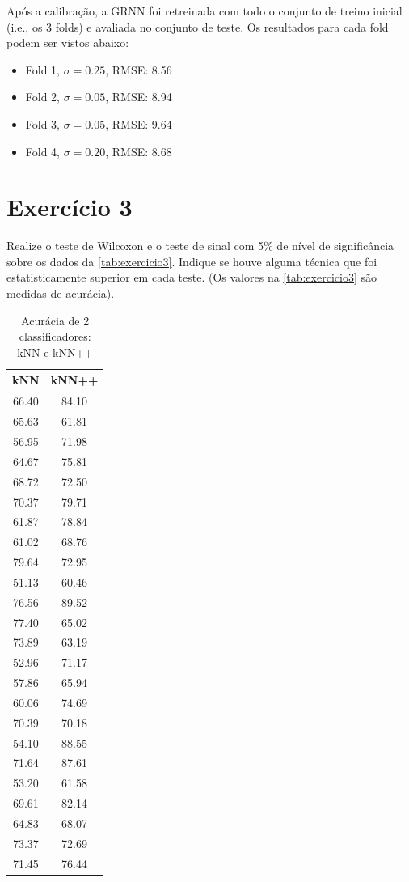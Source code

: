 \documentclass{article}
\begin{document}
Após a calibração, a GRNN foi retreinada com todo o conjunto de treino inicial (i.e., os 3 folds) e avaliada no conjunto de teste. Os resultados para cada fold podem ser vistos abaixo:

\begin{itemize}
	\item Fold 1, $\sigma=0.25$, RMSE: 8.56
	\item Fold 2, $\sigma=0.05$, RMSE: 8.94
	\item Fold 3, $\sigma=0.05$, RMSE: 9.64
	\item Fold 4, $\sigma=0.20$, RMSE: 8.68
\end{itemize}

\section{Exercício 3}

Realize o teste de Wilcoxon e o teste de sinal com 5\% de nível de significância sobre os dados da \autoref{tab:exercicio3}. Indique se houve alguma técnica que foi estatisticamente superior em cada teste. (Os valores na \autoref{tab:exercicio3} são medidas de acurácia).

\begin{table}[h!]
	\centering
	\caption{Acurácia de 2 classificadores: kNN e kNN++}
	\label{tab:exercicio3}
	\begin{tabular}{@{}cc@{}}
		\toprule
		kNN   & kNN++ \\ \midrule
		66.40 & 84.10 \\
		65.63 & 61.81 \\
		56.95 & 71.98 \\
		64.67 & 75.81 \\
		68.72 & 72.50 \\
		70.37 & 79.71 \\
		61.87 & 78.84 \\
		61.02 & 68.76 \\
		79.64 & 72.95 \\
		51.13 & 60.46 \\
		76.56 & 89.52 \\
		77.40 & 65.02 \\
		73.89 & 63.19 \\
		52.96 & 71.17 \\
		57.86 & 65.94 \\
		60.06 & 74.69 \\
		70.39 & 70.18 \\
		54.10 & 88.55 \\
		71.64 & 87.61 \\
		53.20 & 61.58 \\
		69.61 & 82.14 \\
		64.83 & 68.07 \\
		73.37 & 72.69 \\
		71.45 & 76.44 \\ \bottomrule
	\end{tabular}
\end{table}
\end{document}
